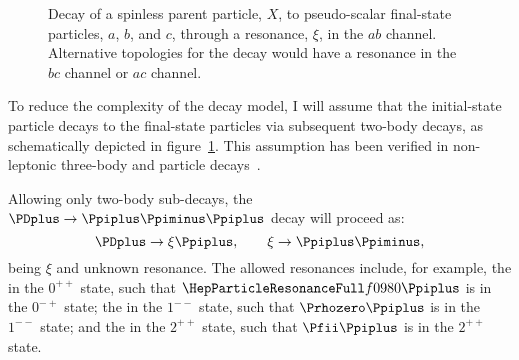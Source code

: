 
    \begin{figure}
        \centering
        
        \caption{Decay of a spinless parent particle, $X$, to pseudo-scalar final-state particles, $a$, $b$, and $c$, through a resonance, $\xi$, in the $ab$ channel. Alternative topologies for the decay would have a resonance in the $bc$ channel or $ac$ channel.}
        \label{fig:isobar_three_body_decay}
    \end{figure}
    To reduce the complexity of the decay model, I will assume that the initial-state particle decays to the final-state particles via subsequent two-body decays, as schematically depicted in figure~\ref{fig:isobar_three_body_decay}.
    This assumption has been verified in non-leptonic three-body \PD{} and \PB{} particle decays~\cite[\S~13.2]{Bevan:2014iga}.


    Allowing only two-body sub-decays, the $\PDplus \to \Ppiplus\Ppiminus\Ppiplus$ decay will proceed as:
    \begin{equation}
        \PDplus\to\xi\Ppiplus,\qquad
        \xi\to\Ppiplus\Ppiminus,
    \end{equation}
    being $\xi$ and unknown resonance.
    The allowed resonances include, for example, the \Pfnez{} in the $0^{++}$ state, such that $\Pfnez\Ppiplus$ is in the $0^{-+}$ state;
    the \Prhozero{} in the $1^{--}$ state, such that $\Prhozero\Ppiplus$ is in the $1^{--}$ state;
    and the \Pfii{} in the $2^{++}$ state, such that $\Pfii\Ppiplus$ is in the $2^{++}$ state.


